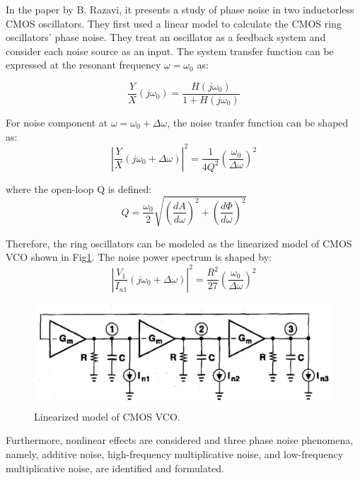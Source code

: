 \documentclass[conference]{IEEEtran}
\begin{document}
In the paper by B. Razavi\cite{b3}, it presents a study of phase noise in two inductorless CMOS oscillators. They first used a linear model to calculate the CMOS ring oscillators' phase noise. They treat an oscillator as a feedback system and consider each noise source as an input. The system transfer function can be expressed at the resonant frequency $\omega=\omega_0$ as:

\begin{equation}
\frac{Y}{X}(j\omega_0)=\frac{H(j\omega_0)}{1+H(j\omega_0)}
\label{eq3-1}
\end{equation}

For noise component at $\omega = \omega_0 + \Delta\omega$, the noise tranfer function can be shaped as: 
\begin{equation}
|\frac{Y}{X}(j\omega_0+\Delta\omega)|^2=\frac{1}{4Q^2}(\frac{\omega_0}{\Delta\omega})^2
\label{eq3-2}
\end{equation}

where the open-loop Q is defined:
\begin{equation}
Q=\frac{\omega_0}{2}\sqrt{(\frac{dA}{d\omega})^2+(\frac{d\Phi}{d\omega})^2}
\label{eq3-3}
\end{equation}

Therefore, the ring oscillators can be modeled as the linearized model of CMOS VCO shown in Fig\ref{fig3-2}. The noise power spectrum is shaped by:
\begin{equation}
|\frac{V_1}{I_{n1}}(j\omega_0+\Delta\omega)|^2=\frac{R^2}{27}(\frac{\omega_0}{\Delta\omega})^2
\label{eq3-4}
\end{equation}

\begin{figure}[!h]
\centerline{\includegraphics[scale=0.2]{fig/pic3-2.jpg}}
\caption{Linearized model of CMOS VCO.\cite{b3}}
\label{fig3-2}
\end{figure}

Furthermore, nonlinear effects are considered and three phase noise phenomena, namely, additive noise, high-frequency multiplicative noise, and low-frequency multiplicative noise, are identified and formulated. 
\end{document}
